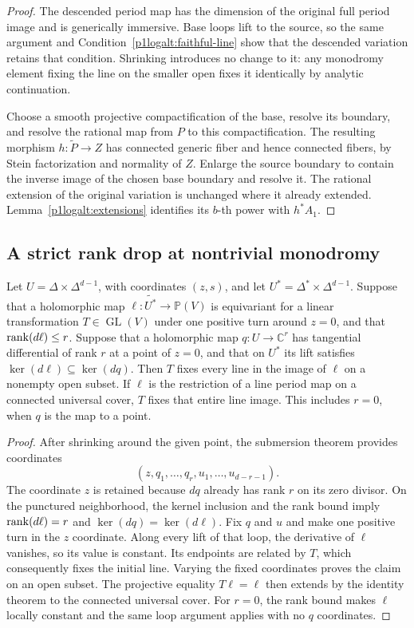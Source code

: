 \begin{proof}
The descended period map has the dimension of the original full period
image and is generically immersive.  Base loops lift to the source, so
the same argument and Condition~\eqref{p1logalt:faithful-line} show that the descended
variation retains that condition.  Shrinking introduces no change to
it: any monodromy element fixing the line on the smaller open fixes it
identically by analytic continuation.

Choose a smooth projective compactification of the base, resolve its
boundary, and resolve the rational map from $P$ to this compactification.
The resulting morphism $h:\widetilde P\to Z$ has connected generic
fiber and hence connected fibers, by Stein factorization and normality
of $Z$.  Enlarge the source boundary to contain the inverse image of
the chosen base boundary and resolve it.  The rational extension of
the original variation is unchanged where it already extended.
Lemma~\ref{p1logalt:extensions} identifies its $b$-th power with $h^*A_1$.
\end{proof}

\subsection{A strict rank drop at nontrivial monodromy}

\begin{lemma}\label{p4int:transverse-loop}
Let $U=\Delta\times\Delta^{d-1}$, with coordinates $(z,s)$, and let
$U^*=\Delta^*\times\Delta^{d-1}$.  Suppose that a holomorphic map
$\ell:\widetilde{U^*}\to\mathbb P(V)$ is equivariant for a linear
transformation $T\in\operatorname{GL}(V)$ under one positive turn around
$z=0$, and that $\operatorname{rank}(d\ell)\leq r$.  Suppose that a holomorphic map
$q:U\to\mathbb C^r$ has tangential differential of rank $r$ at a point
of $z=0$, and that on $U^*$ its lift satisfies
$\ker(d\ell)\subseteq\ker(dq)$.
Then $T$ fixes every line in the image of $\ell$ on a nonempty open
subset.  If $\ell$ is the restriction of a line period map on a connected
universal cover, $T$ fixes that entire line image.  This includes $r=0$,
when $q$ is the map to a point.
\end{lemma}

\begin{proof}
After shrinking around the given point, the submersion theorem provides
coordinates
\[
            (z,q_1,\ldots,q_r,u_1,\ldots,u_{d-r-1}).
\]
The coordinate $z$ is retained because $dq$ already has rank $r$ on its
zero divisor.  On the punctured neighborhood, the kernel inclusion and
the rank bound imply
$\operatorname{rank}(d\ell)=r$ and $\ker(dq)=\ker(d\ell)$.
Fix $q$ and $u$ and make one positive turn in the $z$ coordinate.
Along every lift of that loop, the derivative of $\ell$ vanishes, so its
value is constant.  Its endpoints are related by $T$, which consequently
fixes the initial line.  Varying the fixed coordinates proves the claim
on an open subset.  The projective equality $T\ell=\ell$ then extends by
the identity theorem to the connected universal cover.  For $r=0$, the
rank bound makes $\ell$ locally constant and the same loop argument
applies with no $q$ coordinates.
\end{proof}

